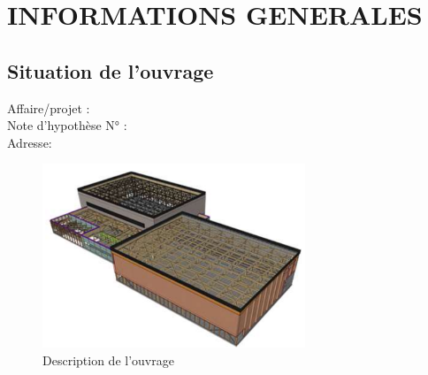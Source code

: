 \documentclass{rSIMONIN} %
\begin{document}
\pagestyle{rSIMONIN} %
\thispagestyle{empty} %
\frontpageSTB %

{
    \setcounter{tocdepth}{1} %
    \renewcommand{\contentsname}{Sommaire} %
    \tableofcontents %
}
\clearpage %


\newpage %

\chapter{INFORMATIONS GENERALES} %

\section{Situation de l'ouvrage} %

Affaire/projet : \numeroaffaire \numeroreference  \\ %
Note d'hypothèse N° : \notehypotheses \\ %
Adresse: \adresseprojet \\ %


\begin{figure}[H] %
    \centering %
    \includegraphics[width=0.7\textwidth]{input_data/situation_ouvrage.png} %
    \caption{Description de l'ouvrage} %
\end{figure}
\end{document}
